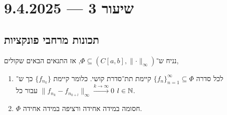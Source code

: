 \section{שיעור 3 --- 9.4.2025}

\subsection{תכונות מרחבי פונקציות}
\begin{theorem}
	נניח ש־$\Phi \subseteq (C[a, b], \lVert \cdot \rVert_\infty)$, אז התנאים הבאים שקולים,
	\begin{enumerate}
		\item לכל סדרה ${\{ f_n \}}_{n = 1}^\infty \subseteq \Phi$ קיימת תת־סדרת קושי.
			כלומר קיימת $\{ f_{n_k} \}$ כך ש־$\lVert f_{n_k} - f_{n_{k + l}} \rVert_\infty \xrightarrow{k \to \infty} 0$ עבור כל $l \in \mathbb{N}$.
		\item $\Phi$ חסומה במידה אחידה ורציפה במידה אחידה.
	\end{enumerate}
\end{theorem}
